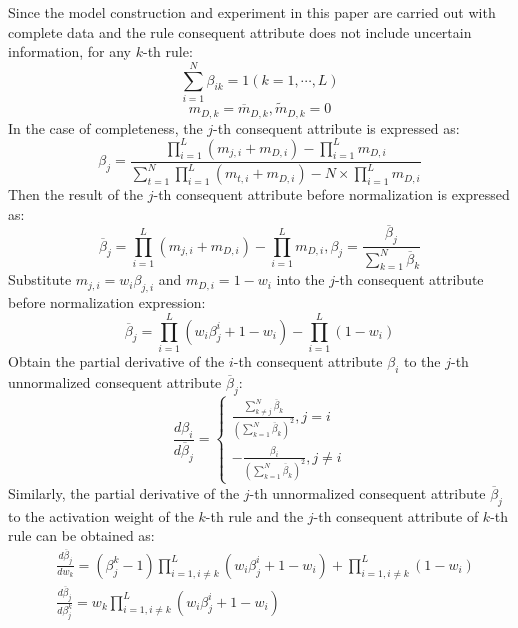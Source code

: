 \documentclass{ieeeaccess}
\begin{document}
Since the model construction and experiment in this paper are carried out with complete data and
the rule consequent attribute does not include uncertain information, for any $k$-th rule:
\begin{equation}
    \sum_{i=1}^N\beta_{ik}=1(k=1,\cdots,L)
\end{equation}
\begin{equation}
    m_{D,k}=\overline{m}_{D,k},\widetilde{m}_{D,k}=0
\end{equation}
In the case of completeness, the $j$-th consequent attribute is expressed as:
\begin{equation}
    \beta_j=\frac{\prod_{i=1}^L(m_{j,i}+m_{D,i})-\prod_{i=1}^Lm_{D,i}}{\sum_{t=1}^N\prod_{i=1}^L(m_{t,i}+m_{D,i})-N\times\prod_{i=1}^Lm_{D,i}}
\end{equation}
Then the result of the $j$-th consequent attribute before normalization is expressed as:
\begin{equation}
    \overline{\beta}_j = \prod_{i=1}^L(m_{j,i}+m_{D,i})-\prod_{i=1}^Lm_{D,i},\beta_j=\frac{\overline{\beta}_j}{\sum_{k=1}^N\overline{\beta}_k}
\end{equation}
Substitute $m_{j,i}=w_i\beta_{j,i}$ and $m_{D,i}=1-w_i$ into the $j$-th consequent attribute before normalization expression:
\begin{equation}
    \overline{\beta}_j = \prod_{i=1}^L(w_i\beta_j^i+1-w_i)-\prod_{i=1}^L{(1-w_i)}
\end{equation}
Obtain the partial derivative of the $i$-th consequent attribute $\beta_i$ to the $j$-th unnormalized consequent attribute $\overline{\beta}_j$:
\begin{equation}
    \frac{d\beta_i}{d\overline{\beta}_j}=
    \left\{
    \begin{aligned}
        \frac{\sum_{k\neq j}^N\overline{\beta}_k}{(\sum_{k=1}^N\overline{\beta}_k)^2},j=i \\
        -\frac{\beta_i}{(\sum_{k=1}^N\overline{\beta}_k)^2},j\neq i
    \end{aligned}
    \right.
\end{equation}
Similarly, the partial derivative of the $j$-th unnormalized consequent attribute $\overline{\beta}_j$ to the activation weight of the $k$-th rule and the $j$-th consequent attribute of $k$-th rule can be obtained as:
\begin{align}
     & \frac{d\overline{\beta}_j}{dw_k}=(\beta_j^k-1)\prod_{i=1,i\neq k}^L(w_i\beta_j^i+1-w_i)+\prod_{i=1,i\neq k}^L(1-w_i) \\
     & \frac{d\overline{\beta}_j}{d\beta_j^k}=w_k\prod_{i=1,i\neq k}^L(w_i\beta_j^i+1-w_i)
\end{align}
\end{document}
